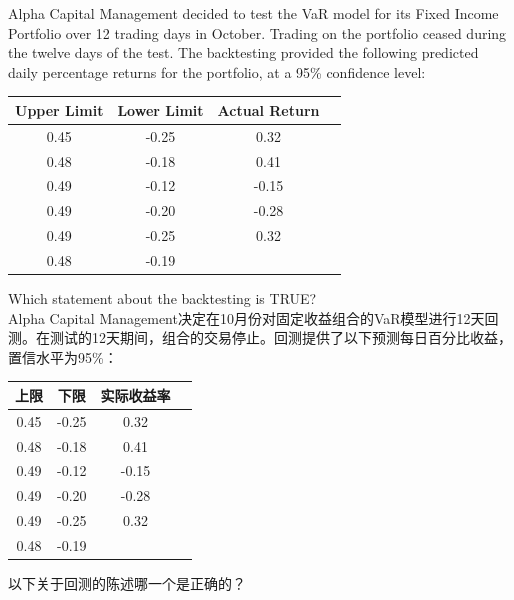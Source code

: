 \documentclass{article}
\newcounter{question} %
\begin{document}
\begin{question}
    Alpha Capital Management decided to test the VaR model for its Fixed Income Portfolio over 12 trading days in October. Trading on the portfolio ceased during the twelve days of the test. The backtesting provided the following predicted daily percentage returns for the portfolio, at a 95\% confidence level:

    \begin{table}[H]
        \centering
        \begin{tabular}{cccc}
            \hline
            Upper Limit & Lower Limit & Actual Return \\
            \hline
            0.45 & -0.25 & 0.32 \\
            0.48 & -0.18 & 0.41 \\
            0.49 & -0.12 & -0.15 \\
            0.49 & -0.20 & -0.28 \\
            0.49 & -0.25 & 0.32 \\
            0.48 & -0.19 &       \\
            \hline
        \end{tabular}
    \end{table}
    Which statement about the backtesting is TRUE?
    \\Alpha Capital Management决定在10月份对固定收益组合的VaR模型进行12天回测。在测试的12天期间，组合的交易停止。回测提供了以下预测每日百分比收益，置信水平为95\%：
    \begin{table}[H]
        \centering
        \begin{tabular}{cccc}
            \hline
            上限 & 下限 & 实际收益率 \\
            \hline
            0.45 & -0.25 & 0.32 \\
            0.48 & -0.18 & 0.41 \\
            0.49 & -0.12 & -0.15 \\
            0.49 & -0.20 & -0.28 \\
            0.49 & -0.25 & 0.32 \\
            0.48 & -0.19 &       \\
            \hline
        \end{tabular}
    \end{table}
    以下关于回测的陈述哪一个是正确的？
\end{question}
\end{document}
